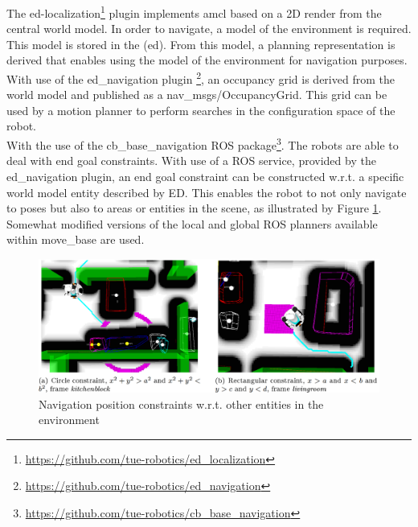 The \acrshort{ed}-localization\footnote{\url{https://github.com/tue-robotics/ed_localization}} plugin implements \acrshort{amcl} based on a 2D render from the central world model. In order to navigate, a model of the environment is required. This model is stored in the (\acrshort{ed}). From this model, a planning representation is derived that enables using the model of the environment for navigation purposes.
\\
With use of the ed\_navigation plugin \footnote{\url{https://github.com/tue-robotics/ed_navigation}}, an occupancy grid is derived from the world model and published as a nav\_msgs/OccupancyGrid. This grid can be used by a motion planner to perform searches in the configuration space of the robot.
\\
With the use of the cb\_base\_navigation ROS package\footnote{\url{https://github.com/tue-robotics/cb_base_navigation}}. The robots are able to deal with end goal constraints. With use of a ROS service, provided by the ed\_navigation plugin, an end goal constraint can be constructed w.r.t. a specific world model entity described by ED. This enables the robot to not only navigate to poses but also to areas or entities in the scene, as illustrated by Figure \ref{fig:ed_navigation_constraints}. Somewhat modified versions of the local and global ROS planners available within move\_base are used. 
\begin{figure}[h]
	\centering
	\includegraphics[width = 1\linewidth]{Figures/ed_navigation_constraints}
	\caption{Navigation position constraints w.r.t. other entities in the environment}
	\label{fig:ed_navigation_constraints}
\end{figure}